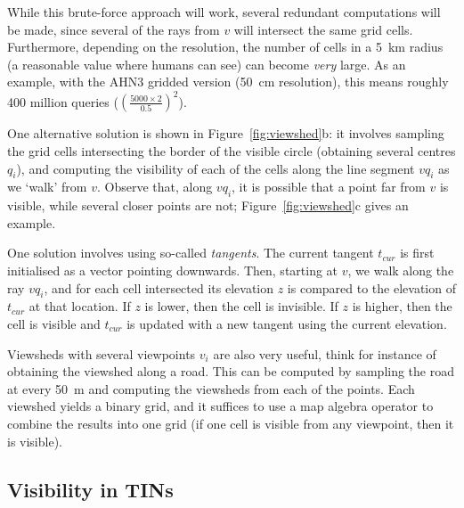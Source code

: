 %

While this brute-force approach will work, several redundant computations will be made, since several of the rays from $v$ will intersect the same grid cells.
Furthermore, depending on the resolution, the number of cells in a \qty{5}{\km} radius (a reasonable value where humans can see) can become \emph{very} large.
As an example, with the AHN3 gridded version (\qty{50}{\cm} resolution), this means roughly 400 million queries ($(\frac{5000 \times 2}{0.5})^2$).

%

One alternative solution is shown in Figure~\ref{fig:viewshed}b: it involves sampling the grid cells intersecting the border of the visible circle (obtaining several centres $q_i$), and computing the visibility of each of the cells along the line segment $vq_i$ as we `walk' from $v$.
Observe that, along $vq_i$, it is possible that a point far from $v$ is visible, while several closer points are not; Figure~\ref{fig:viewshed}c gives an example.

One solution involves using so-called \emph{tangents}.
The current tangent $t_{cur}$ is first initialised as a vector pointing downwards.
Then, starting at $v$, we walk along the ray $vq_i$, and for each cell intersected its elevation $z$ is compared to the elevation of $t_{cur}$ at that location.
If $z$ is lower, then the cell is invisible.
If $z$ is higher, then the cell is visible and $t_{cur}$ is updated with a new tangent using the current elevation.

Viewsheds with several viewpoints $v_i$ are also very useful, think for instance of obtaining the viewshed along a road.
This can be computed by sampling the road at every \qty{50}{\m} and computing the viewsheds from each of the points. 
Each viewshed yields a binary grid, and it suffices to use a map algebra operator to combine the results into one grid (if one cell is visible from any viewpoint, then it is visible).


%
\subsection{Visibility in TINs}



